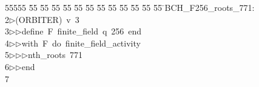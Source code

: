 %
%
\begin{tabbing}
55555 \= 55 \= 55 \= 55 \= 55 \= 55 \= 55 \= 55 \= 55 \= 55 \= 55 \= 55 \= 55 \= \>BCH\_F256\_roots\_771:\\[0pt]
2\>$\triangleright$\>(ORBITER)\ v\ 3\ \\[0pt]
3\>$\triangleright$\>$\triangleright$\>define\ F\ finite\_field\ q\ 256\ end\ \\[0pt]
4\>$\triangleright$\>$\triangleright$\>with\ F\ do\ finite\_field\_activity\ \\[0pt]
5\>$\triangleright$\>$\triangleright$\>$\triangleright$\>nth\_roots\ 771\ \\[0pt]
6\>$\triangleright$\>$\triangleright$\>end\\[0pt]
7\>\end{tabbing}
